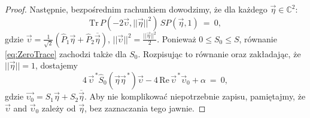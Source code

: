 \begin{proof}
Następnie, bezpośrednim rachunkiem dowodzimy, że dla każdego
$\vec{\eta} \in \mathbb{C}^{2}$:
\begin{equation}
 \label{eq:ZeroTrace}
 \text{Tr} \, P(-2\vec{\upsilon}, ||\vec{\eta}||^{2}) \, S P(\vec{\eta},1)
     \:=\: 0,
\end{equation}
gdzie $\vec{\upsilon} =
 \frac{1}{\sqrt{2}} \left(
  \hat{P}_{1} \vec{\eta} + \hat{P}_{2} \overline{\vec{\eta}}
 \right)$,
$||\vec{\upsilon}||^{2} = \tfrac{||\vec{\eta}||^{2}}{2}$.
Ponieważ $0 \leq S_{0} \leq S$, równanie
\eqref{eq:ZeroTrace} zachodzi także dla $S_{0}$.
Rozpisując to równanie oraz zakładając, że $||\vec{\eta}|| = 1$,
dostajemy
\begin{equation}
 \label{eq:ZeroTraceExplicit}
 4 \, \vec{\upsilon}^{\,*} \hat{S}_{0}(\vec{\eta} \vec{\eta}^{\,*}) \vec{\upsilon} -
 4 \, \text{Re} \, \vec{\upsilon}^{\,*} \vec{\upsilon}_{0} + \alpha \: = \: 0,
\end{equation}
gdzie $\vec{\upsilon_{0}} = S_{1} \vec{\eta} + S_{2} \overline{\vec{\eta}}$.
Aby nie komplikować niepotrzebnie zapisu,
pamiętajmy, że $\vec{\upsilon}$ and $\vec{\upsilon}_{0}$ zależy od $\vec{\eta}$,
bez zaznaczania tego jawnie.


\end{proof}
